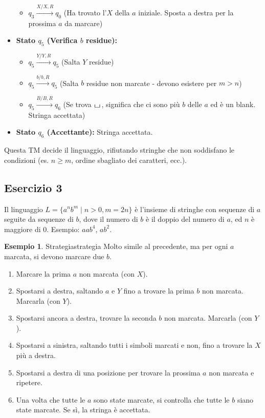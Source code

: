 \documentclass[a4paper]{article}
\theoremstyle{definition} %
\newtheorem{example}{Esempio}
\newcommand{\blankS}{\ensuremath{\raisebox{-0.15ex}{\scalebox{1.3}[0.7]{$\sqcup$}}\mkern2mu}}
\begin{document}
\begin{itemize}
\begin{itemize}
            \item $q_3 \xrightarrow{X / X, R} q_0$ (Ha trovato l'$X$ della $a$ iniziale. Sposta a destra per la prossima $a$ da marcare)
        \end{itemize}
    \item \textbf{Stato $q_5$ (Verifica $b$ residue):}
        \begin{itemize}
            \item $q_5 \xrightarrow{Y / Y, R} q_5$ (Salta $Y$ residue)
            \item $q_5 \xrightarrow{b / b, R} q_5$ (Salta $b$ residue non marcate - devono esistere per $m>n$)
            \item $q_5 \xrightarrow{B / B, R} q_6$ (Se trova \blankS, significa che ci sono più $b$ delle $a$ ed è un blank. Stringa accettata)
        \end{itemize}
    \item \textbf{Stato $q_6$ (Accettante):} Stringa accettata.
\end{itemize}
Questa TM decide il linguaggio, rifiutando stringhe che non soddisfano le condizioni (es. $n \ge m$, ordine sbagliato dei caratteri, ecc.).

\subsection{Esercizio 3}
Il linguaggio $L = \{a^n b^m \mid n > 0, m = 2n\}$ è l'insieme di stringhe con sequenze di $a$ seguite da sequenze di $b$, dove il numero di $b$ è il doppio del numero di $a$, ed $n$ è maggiore di $0$. Esempio: $aab^{4}$, $ab^{2}$.

\begin{example}{Strategia}{strategia}
Molto simile al precedente, ma per ogni $a$ marcata, si devono marcare due $b$.
\begin{enumerate}
    \item Marcare la prima $a$ non marcata (con $X$).
    \item Spostarsi a destra, saltando $a$ e $Y$ fino a trovare la prima $b$ non marcata. Marcarla (con $Y$).
    \item Spostarsi ancora a destra, trovare la seconda $b$ non marcata. Marcarla (con $Y$).
    \item Spostarsi a sinistra, saltando tutti i simboli marcati e non, fino a trovare la $X$ più a destra.
    \item Spostarsi a destra di una posizione per trovare la prossima $a$ non marcata e ripetere.
    \item Una volta che tutte le $a$ sono state marcate, si controlla che tutte le $b$ siano state marcate. Se sì, la stringa è accettata.
\end{enumerate}
\end{example}
\end{document}
